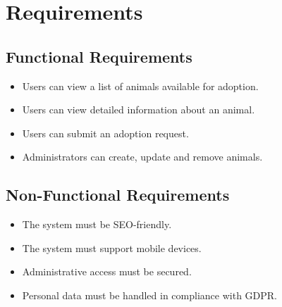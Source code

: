 \section{Requirements}

\subsection{Functional Requirements}
\begin{itemize}
  \item Users can view a list of animals available for adoption.
  \item Users can view detailed information about an animal.
  \item Users can submit an adoption request.
  \item Administrators can create, update and remove animals.
\end{itemize}

\subsection{Non-Functional Requirements}
\begin{itemize}
  \item The system must be SEO-friendly.
  \item The system must support mobile devices.
  \item Administrative access must be secured.
  \item Personal data must be handled in compliance with GDPR.
\end{itemize}
